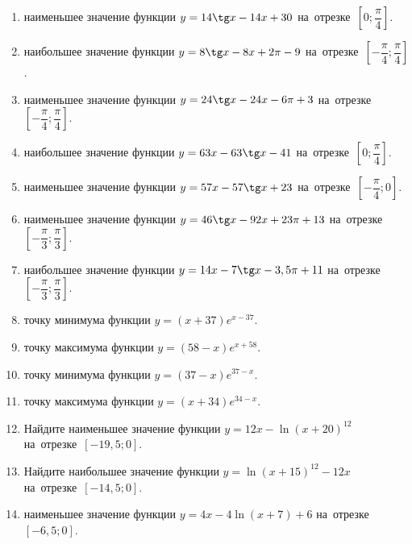 \documentclass[a4paper,10pt]{article}
\begin{document}
\begin{enumerate}
\item {} наименьшее значение функции $y = 14\tg x-14x+30$ на~отрезке~$\left[0;\dfrac{\pi }{4}\right]$.

\item {} наибольшее значение функции $y=8\tg x-8x+2\pi -9$ на~отрезке~$\left[-\dfrac{\pi }{4};\dfrac{\pi }{4}\right]$.

\item {} наименьшее значение функции $y=24\tg x-24x-6\pi +3$ на~отрезке~$\left[-\dfrac{\pi }{4};\dfrac{\pi }{4}\right]$.

\item {} наибольшее значение функции $y = 63x-63\tg x -41$ на~отрезке~$\left[0;\dfrac{\pi }{4}\right]$.

\item {} наименьшее значение функции $y = 57x-57\tg x +23$ на~отрезке~$\left[-\dfrac{\pi }{4};0\right]$.

\item {} наименьшее значение функции $y = 46\tg x-92x+23 \pi +13$ на~отрезке~$\left[-\dfrac{\pi }{3};\dfrac{\pi }{3}\right]$.

\item {} наибольшее значение функции $y=14x-7\tg x-3,5\pi +11$ на~отрезке~$\left[-\dfrac{\pi }{3};\dfrac{\pi }{3}\right]$.

\item {} точку минимума функции $y = \left(x+37\right)e^{x-37}$.

\item {} точку максимума функции $y = \left(58-x\right)e^{x+58}$.

\item {} точку минимума функции $y = \left(37-x\right)e^{37-x}$.

\item {} точку максимума функции $y = \left(x+34\right)e^{34-x}$.

\item Найдите наименьшее значение функции $y = 12x-\ln \left(x+20\right)^{12}$ на~отрезке~$\left[-19,5;0\right]$.

\item Найдите наибольшее значение функции $y = \ln \left(x+15\right)^{12}-12x$ на~отрезке~$\left[-14,5;0\right]$.

\item {} наименьшее значение функции $y=4x-4\ln \left(x+7\right)+6$ на~отрезке~$\left[-6,5;0\right]$.


\end{enumerate}
\end{document}
